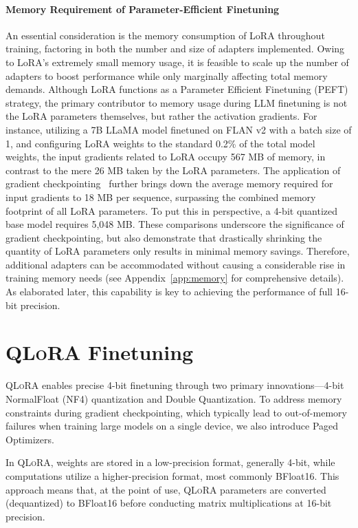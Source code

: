 \paragraph{Memory Requirement of Parameter-Efficient Finetuning} An essential consideration is the memory consumption of LoRA throughout training, factoring in both the number and size of adapters implemented. Owing to LoRA's extremely small memory usage, it is feasible to scale up the number of adapters to boost performance while only marginally affecting total memory demands. Although LoRA functions as a Parameter Efficient Finetuning (PEFT) strategy, the primary contributor to memory usage during LLM finetuning is not the LoRA parameters themselves, but rather the activation gradients. For instance, utilizing a 7B LLaMA model finetuned on FLAN v2 with a batch size of 1, and configuring LoRA weights to the standard 0.2\% of the total model weights\citep{hu2021lora,liu2022few}, the input gradients related to LoRA occupy 567 MB of memory, in contrast to the mere 26 MB taken by the LoRA parameters. The application of gradient checkpointing~\citep{chen2016training} further brings down the average memory required for input gradients to 18 MB per sequence, surpassing the combined memory footprint of all LoRA parameters. To put this in perspective, a 4-bit quantized base model requires 5,048 MB. These comparisons underscore the significance of gradient checkpointing, but also demonstrate that drastically shrinking the quantity of LoRA parameters only results in minimal memory savings. Therefore, additional adapters can be accommodated without causing a considerable rise in training memory needs (see Appendix~\ref{app:memory} for comprehensive details). As elaborated later, this capability is key to achieving the performance of full 16-bit precision.

\section{\textsc{QLoRA} Finetuning}

\textsc{QLoRA} enables precise 4-bit finetuning through two primary innovations—4-bit NormalFloat (NF4) quantization and Double Quantization. To address memory constraints during gradient checkpointing, which typically lead to out-of-memory failures when training large models on a single device, we also introduce Paged Optimizers.

In \textsc{QLoRA}, weights are stored in a low-precision format, generally 4-bit, while computations utilize a higher-precision format, most commonly BFloat16. This approach means that, at the point of use, \textsc{QLoRA} parameters are converted (dequantized) to BFloat16 before conducting matrix multiplications at 16-bit precision.

